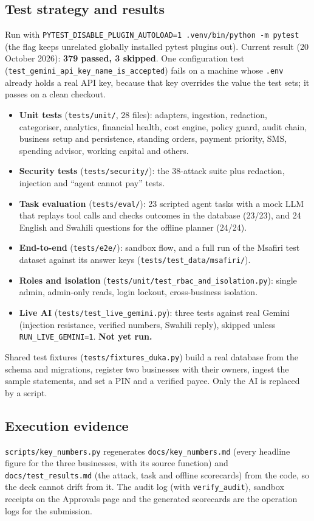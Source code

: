 \documentclass[10pt,a4paper]{article}
\newcommand{\code}[1]{\texttt{\small #1}}
\begin{document}
\subsection{Test strategy and results}
\label{sec:tests}
Run with \code{PYTEST\_DISABLE\_PLUGIN\_AUTOLOAD=1 .venv/bin/python -m pytest} (the flag keeps unrelated globally installed pytest plugins out). Current result (20 October 2026): \textbf{379 passed, 3 skipped}. One configuration test (\code{test\_gemini\_api\_key\_name\_is\_accepted}) fails on a machine whose \code{.env} already holds a real API key, because that key overrides the value the test sets; it passes on a clean checkout.
\begin{itemize}
  \item \textbf{Unit tests} (\code{tests/unit/}, 28 files): adapters, ingestion, redaction, categoriser, analytics, financial health, cost engine, policy guard, audit chain, business setup and persistence, standing orders, payment priority, SMS, spending advisor, working capital and others.
  \item \textbf{Security tests} (\code{tests/security/}): the 38-attack suite plus redaction, injection and ``agent cannot pay'' tests.
  \item \textbf{Task evaluation} (\code{tests/eval/}): 23 scripted agent tasks with a mock LLM that replays tool calls and checks outcomes in the database (23/23), and 24 English and Swahili questions for the offline planner (24/24).
  \item \textbf{End-to-end} (\code{tests/e2e/}): sandbox flow, and a full run of the Msafiri test dataset against its answer keys (\code{tests/test\_data/msafiri/}).
  \item \textbf{Roles and isolation} (\code{tests/unit/test\_rbac\_and\_isolation.py}): single admin, admin-only reads, login lockout, cross-business isolation.
  \item \textbf{Live AI} (\code{tests/test\_live\_gemini.py}): three tests against real Gemini (injection resistance, verified numbers, Swahili reply), skipped unless \code{RUN\_LIVE\_GEMINI=1}. \textbf{Not yet run.}
\end{itemize}
Shared test fixtures (\code{tests/fixtures\_duka.py}) build a real database from the schema and migrations, register two businesses with their owners, ingest the sample statements, and set a PIN and a verified payee. Only the AI is replaced by a script.

\subsection{Execution evidence}
\label{sec:evidence}
\code{scripts/key\_numbers.py} regenerates \code{docs/key\_numbers.md} (every headline figure for the three businesses, with its source function) and \code{docs/test\_results.md} (the attack, task and offline scorecards) from the code, so the deck cannot drift from it. The audit log (with \code{verify\_audit}), sandbox receipts on the Approvals page and the generated scorecards are the operation logs for the submission.
\end{document}
